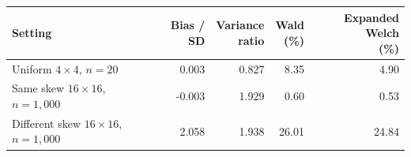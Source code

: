 \begin{tabularx}{\textwidth}{@{}>{\raggedright\arraybackslash}Xrrrr@{}}
\toprule
\textbf{Setting} & \textbf{Bias / SD} & \shortstack[r]{\textbf{Variance}\\\textbf{ratio}} & \shortstack[r]{\textbf{Wald}\\\textbf{(\%)}} & \shortstack[r]{\textbf{Expanded Welch}\\\textbf{(\%)}}\\
\midrule
Uniform \(4\times4\), \(n=20\) & 0.003 & 0.827 & 8.35 & 4.90\\
\addlinespace[0.35em]
Same skew \(16\times16\), \(n=1{,}000\) & -0.003 & 1.929 & 0.60 & 0.53\\
\addlinespace[0.35em]
Different skew \(16\times16\), \(n=1{,}000\) & 2.058 & 1.938 & 26.01 & 24.84\\
\bottomrule
\end{tabularx}
